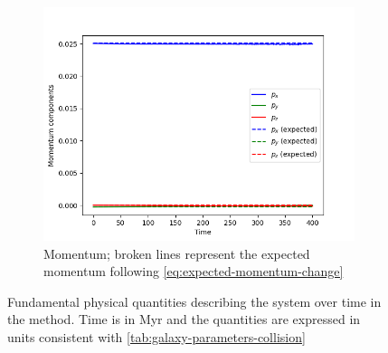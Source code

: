 \begin{figure}[H]
    \vspace{0.2cm}

    \begin{subfigure}[b]{0.45\textwidth}
        \centering
        \includegraphics[width=\textwidth]{chapters/results/img/p3m-collision/momentum.png}
        \caption{Momentum; broken lines represent the expected momentum following \autoref{eq:expected-momentum-change}}
        \label{fig:physical-quantities-p3m-collision-sub3}
    \end{subfigure}

    \caption{Fundamental physical quantities describing the system over time in the \PThreeM{} method.
        Time is in Myr and the quantities are expressed in units consistent with \autoref{tab:galaxy-parameters-collision}}
    \label{fig:physical-quantities-p3m-collision}
\end{figure}

